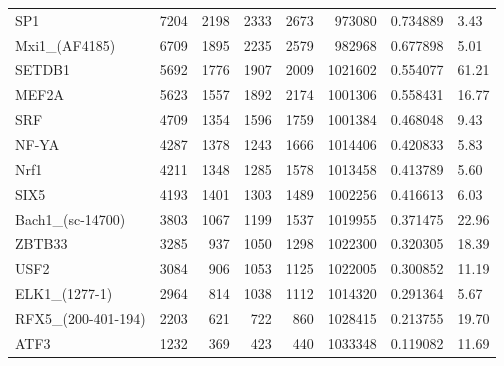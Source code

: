 \begin{table}
\begin{tabular}{lrrrrrrl}
SP1 & 7204 & 2198 & 2333 & 2673 & 973080 & 0.734889 & 3.43 \\
Mxi1\_(AF4185) & 6709 & 1895 & 2235 & 2579 & 982968 & 0.677898 & 5.01 \\
SETDB1 & 5692 & 1776 & 1907 & 2009 & 1021602 & 0.554077 & 61.21 \\
MEF2A & 5623 & 1557 & 1892 & 2174 & 1001306 & 0.558431 & 16.77 \\
SRF & 4709 & 1354 & 1596 & 1759 & 1001384 & 0.468048 & 9.43 \\
NF-YA & 4287 & 1378 & 1243 & 1666 & 1014406 & 0.420833 & 5.83 \\
Nrf1 & 4211 & 1348 & 1285 & 1578 & 1013458 & 0.413789 & 5.60 \\
SIX5 & 4193 & 1401 & 1303 & 1489 & 1002256 & 0.416613 & 6.03 \\
Bach1\_(sc-14700) & 3803 & 1067 & 1199 & 1537 & 1019955 & 0.371475 & 22.96 \\
ZBTB33 & 3285 & 937 & 1050 & 1298 & 1022300 & 0.320305 & 18.39 \\
USF2 & 3084 & 906 & 1053 & 1125 & 1022005 & 0.300852 & 11.19 \\
ELK1\_(1277-1) & 2964 & 814 & 1038 & 1112 & 1014320 & 0.291364 & 5.67 \\
RFX5\_(200-401-194) & 2203 & 621 & 722 & 860 & 1028415 & 0.213755 & 19.70 \\
ATF3 & 1232 & 369 & 423 & 440 & 1033348 & 0.119082 & 11.69 \\
\bottomrule
\end{tabular}
\end{table}
